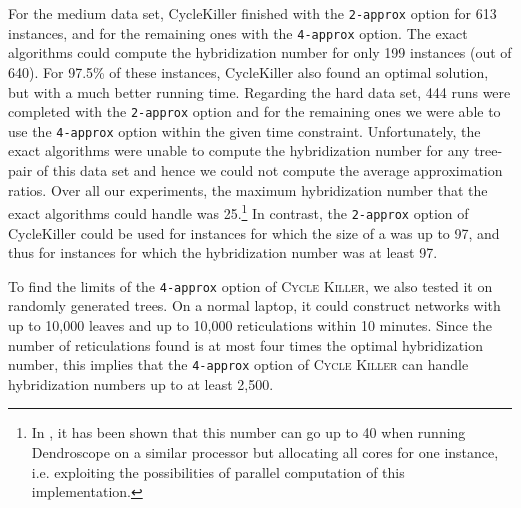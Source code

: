 For the medium data set, {\sc CycleKiller} finished with the \texttt{2-approx} option for 613 instances, and for the remaining ones with the \texttt{4-approx} option. The exact algorithms could compute the hybridization number for only 199 instances (out of 640). For 97.5\% of these instances, {\sc CycleKiller} also found an optimal solution, but with a much better running time.
Regarding the hard data set, 444 runs were completed with the \texttt{2-\hspace{0pt}approx} option and for the remaining ones we were able to use the \texttt{4-approx} option within the given time constraint. Unfortunately, the exact algorithms were unable to compute  the hybridization number for any tree-pair of this data set and hence we could not compute the average approximation ratios.
Over all our experiments, the maximum hybridization number that the exact algorithms could handle was 25.\footnote{In \cite{fastcomputation}, it has been shown that this number can go up to 40 when running Dendroscope on a similar processor but allocating all cores for one instance, i.e. exploiting the possibilities of parallel computation of  this implementation.} In contrast, the \texttt{2-approx} option of {\sc CycleKiller} could be used for instances for which the size of a \maf was up to 97, and thus for instances for which the hybridization number was at least 97.
 
To find the limits of the \texttt{4-approx} option of \textsc{Cycle Killer}, we also tested it on randomly generated trees. On a normal laptop, it could construct networks with up to 10,000 leaves and up to 10,000 reticulations within 10 minutes. Since the number of reticulations found is at most four times the optimal hybridization number, this implies that the \texttt{4-approx} option of \textsc{Cycle Killer} can handle hybridization numbers up to at least 2,500. %



